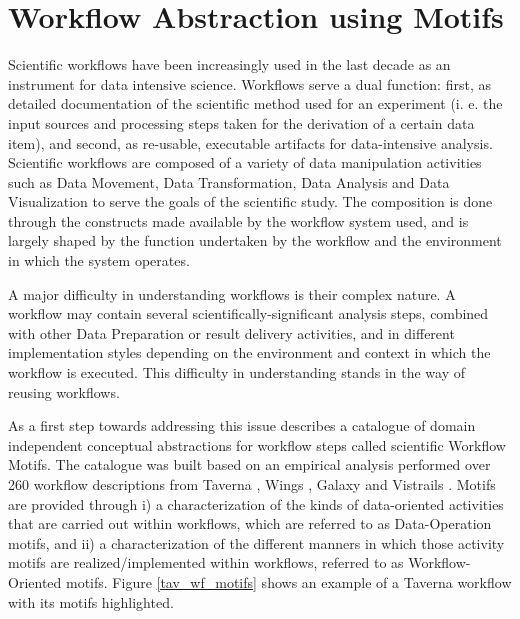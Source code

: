 \section{Workflow Abstraction using Motifs}
Scientific workflows have been increasingly used in the last decade as an instrument for data intensive science. Workflows serve a dual function: first, as detailed documentation of the scientific method used for an experiment (i. e. the input sources and processing steps taken for the derivation of a certain data item), and second, as re-usable, executable artifacts for data-intensive analysis. 
Scientific workflows are composed of a variety of data manipulation activities such as Data Movement, Data Transformation, Data Analysis and Data Visualization to serve the goals of the scientific study. The composition is done through the constructs made available by the workflow system used, and is largely shaped by the function undertaken by the workflow and the environment in which the system operates.

A major difficulty in understanding workflows is their complex nature. A workflow may contain several scientifically-significant analysis steps, combined with other Data Preparation or result delivery activities, and in different implementation styles depending on the environment and context in which the workflow is executed. This difficulty in understanding stands in the way of reusing workflows.

As a first step towards addressing this issue \cite{garijo_Alper_2012} describes a catalogue of domain independent conceptual abstractions for workflow steps called scientific Workflow Motifs. The catalogue was built based on an empirical analysis performed over 260 workflow descriptions from Taverna \cite{Missier2010b}, Wings \cite{DBLP:journals/expert/GilRKGGMD11}, Galaxy \cite{Goecks_Nekrutenko_Taylor_2010} and Vistrails \cite{Callahan06-vistrails}. Motifs are provided through i) a characterization of the kinds of data-oriented activities that are carried out within workflows, which are referred to as Data-Operation motifs, and ii) a characterization of the different manners in which those activity motifs are realized/implemented within workflows, referred to as Workflow-Oriented motifs. Figure \ref{tav_wf_motifs} shows an example of a Taverna workflow with its motifs highlighted.

